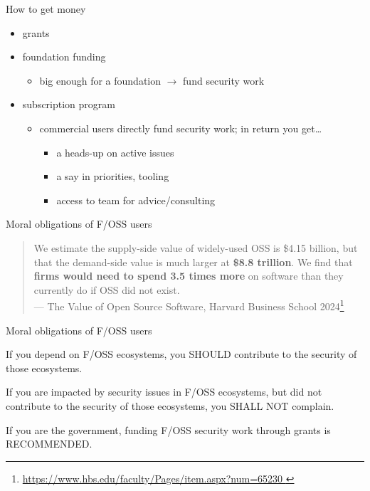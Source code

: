 \documentclass[ignorenonframetext,aspectratio=169,12pt]{beamer}
\begin{document}
\begin{frame}{How to get money}
  \begin{itemize}
    \item grants
    \item foundation funding
      \begin{itemize}
        \item big enough for a foundation $\to$ fund security work
      \end{itemize}
    \item subscription program
      \begin{itemize}
        \item commercial users directly fund security work; in
          return you get…
          \begin{itemize}
            \item a heads-up on active issues
            \item a say in priorities, tooling
            \item access to team for advice/consulting
          \end{itemize}
      \end{itemize}
  \end{itemize}
\end{frame}


\begin{frame}{Moral obligations of F/OSS users}
\large
\begin{quote}
\raggedright
We estimate the supply-side value of widely-used OSS is \$4.15
billion, but that the demand-side value is much larger at {\bf \$8.8
trillion}. We find that {\bf firms would need to spend 3.5 times more} on
software than they currently do if OSS did not exist.\\
{\hfill --- \small The Value of Open Source Software, Harvard Business
School 2024\footnote{\url{
  https://www.hbs.edu/faculty/Pages/item.aspx?num=65230
}}}
\end{quote}
\end{frame}

\begin{frame}{Moral obligations of F/OSS users}
\large
\raggedright
If you depend on F/OSS ecosystems, you SHOULD contribute
to the security of those ecosystems.

\bigskip

If you are impacted by security issues in F/OSS ecosystems,
but did not contribute to the security of those ecosystems,
you SHALL NOT complain.

\bigskip

If you are the government, funding F/OSS security work
  through grants is RECOMMENDED.
\end{frame}
\end{document}
